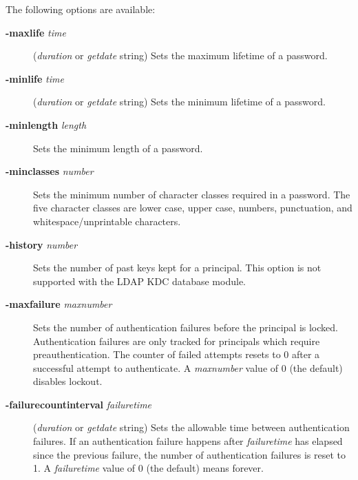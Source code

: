 \documentclass[letterpaper,10pt,english]{sphinxmanual}
\begin{document}
The following options are available:
\begin{description}
\item[{\textbf{-maxlife} \emph{time}}] \leavevmode
(\emph{duration} or \emph{getdate} string) Sets the maximum
lifetime of a password.

\item[{\textbf{-minlife} \emph{time}}] \leavevmode
(\emph{duration} or \emph{getdate} string) Sets the minimum
lifetime of a password.

\item[{\textbf{-minlength} \emph{length}}] \leavevmode
Sets the minimum length of a password.

\item[{\textbf{-minclasses} \emph{number}}] \leavevmode
Sets the minimum number of character classes required in a
password.  The five character classes are lower case, upper case,
numbers, punctuation, and whitespace/unprintable characters.

\item[{\textbf{-history} \emph{number}}] \leavevmode
Sets the number of past keys kept for a principal.  This option is
not supported with the LDAP KDC database module.

\end{description}
\label{admin/database:policy-maxfailure}\begin{description}
\item[{\textbf{-maxfailure} \emph{maxnumber}}] \leavevmode
Sets the number of authentication failures before the principal is
locked.  Authentication failures are only tracked for principals
which require preauthentication.  The counter of failed attempts
resets to 0 after a successful attempt to authenticate.  A
\emph{maxnumber} value of 0 (the default) disables lockout.

\end{description}
\label{admin/database:policy-failurecountinterval}\begin{description}
\item[{\textbf{-failurecountinterval} \emph{failuretime}}] \leavevmode
(\emph{duration} or \emph{getdate} string) Sets the allowable time
between authentication failures.  If an authentication failure
happens after \emph{failuretime} has elapsed since the previous
failure, the number of authentication failures is reset to 1.  A
\emph{failuretime} value of 0 (the default) means forever.

\end{description}
\end{document}
